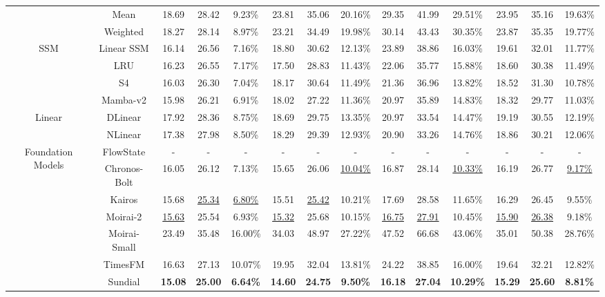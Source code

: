 \begin{table}[t]
{\begin{tabular}{c|c|c|c|c|c|c|c|c|c|c|c|c|c}
 & Mean & 18.69 & 28.42 & 9.23\% & 23.81 & 35.06 & 20.16\% & 29.35 & 41.99 & 29.51\% & 23.95 & 35.16 & 19.63\% \\
 & Weighted & 18.27 & 28.14 & 8.97\% & 23.21 & 34.49 & 19.98\% & 30.14 & 43.43 & 30.35\% & 23.87 & 35.35 & 19.77\% \\
\midrule
\multirow{4}{*}{SSM} & Linear SSM & 16.14 & 26.56 & 7.16\% & 18.80 & 30.62 & 12.13\% & 23.89 & 38.86 & 16.03\% & 19.61 & 32.01 & 11.77\% \\
 & LRU & 16.23 & 26.55 & 7.17\% & 17.50 & 28.83 & 11.43\% & 22.06 & 35.77 & 15.88\% & 18.60 & 30.38 & 11.49\% \\
 & S4 & 16.03 & 26.30 & 7.04\% & 18.17 & 30.64 & 11.49\% & 21.36 & 36.96 & 13.82\% & 18.52 & 31.30 & 10.78\% \\
 & Mamba-v2 & 15.98 & 26.21 & 6.91\% & 18.02 & 27.22 & 11.36\% & 20.97 & 35.89 & 14.83\% & 18.32 & 29.77 & 11.03\% \\
\midrule
\multirow{2}{*}{Linear} & DLinear & 17.92 & 28.36 & 8.75\% & 18.69 & 29.75 & 13.35\% & 20.97 & 33.54 & 14.47\% & 19.19 & 30.55 & 12.19\% \\
 & NLinear & 17.38 & 27.98 & 8.50\% & 18.29 & 29.39 & 12.93\% & 20.90 & 33.26 & 14.76\% & 18.86 & 30.21 & 12.06\% \\
\midrule
\multirow{7}{*}{Foundation Models} & FlowState & - & - & - & - & - & - & - & - & - & - & - & - \\
 & Chronos-Bolt & 16.05 & 26.12 & 7.13\% & 15.65 & 26.06 & \underline{10.04\%} & 16.87 & 28.14 & \underline{10.33\%} & 16.19 & 26.77 & \underline{9.17\%} \\
 & Kairos & 15.68 & \underline{25.34} & \underline{6.80\%} & 15.51 & \underline{25.42} & 10.21\% & 17.69 & 28.58 & 11.65\% & 16.29 & 26.45 & 9.55\% \\
 & Moirai-2 & \underline{15.63} & 25.54 & 6.93\% & \underline{15.32} & 25.68 & 10.15\% & \underline{16.75} & \underline{27.91} & 10.45\% & \underline{15.90} & \underline{26.38} & 9.18\% \\
 & Moirai-Small & 23.49 & 35.48 & 16.00\% & 34.03 & 48.97 & 27.22\% & 47.52 & 66.68 & 43.06\% & 35.01 & 50.38 & 28.76\% \\
 & TimesFM & 16.63 & 27.13 & 10.07\% & 19.95 & 32.04 & 13.81\% & 24.22 & 38.85 & 16.00\% & 19.64 & 32.21 & 12.82\% \\
 & Sundial & \textbf{15.08} & \textbf{25.00} & \textbf{6.64\%} & \textbf{14.60} & \textbf{24.75} & \textbf{9.50\%} & \textbf{16.18} & \textbf{27.04} & \textbf{10.29\%} & \textbf{15.29} & \textbf{25.60} & \textbf{8.81\%} \\

\end{tabular}}
\end{table}
